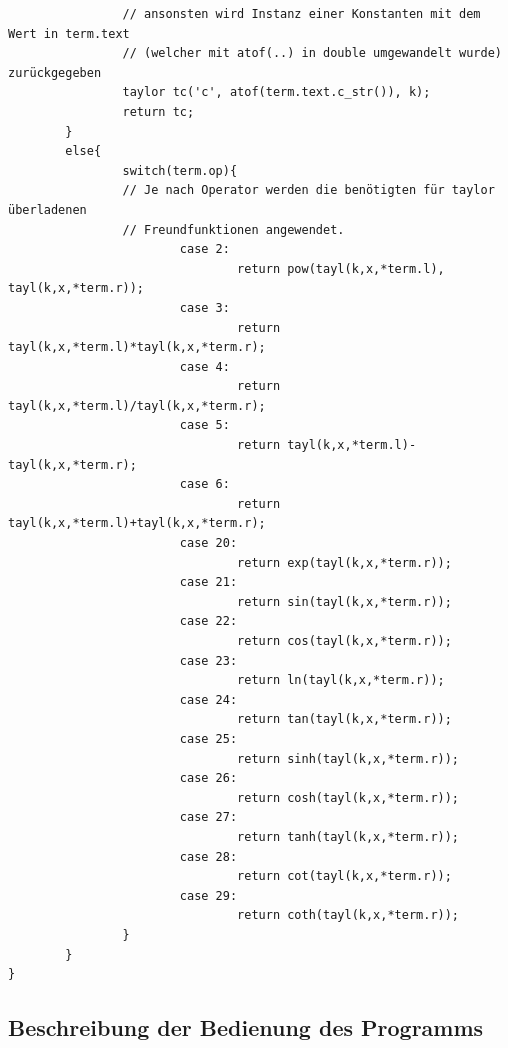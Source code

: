 \documentclass{scrartcl}
\begin{document}
\begin{verbatim}
                // ansonsten wird Instanz einer Konstanten mit dem Wert in term.text
                // (welcher mit atof(..) in double umgewandelt wurde) zurückgegeben
                taylor tc('c', atof(term.text.c_str()), k);
                return tc;		
        }
        else{
                switch(term.op){
                // Je nach Operator werden die benötigten für taylor überladenen
                // Freundfunktionen angewendet.
                        case 2:
                                return pow(tayl(k,x,*term.l), tayl(k,x,*term.r));
                        case 3:				
                                return tayl(k,x,*term.l)*tayl(k,x,*term.r);
                        case 4:				
                                return tayl(k,x,*term.l)/tayl(k,x,*term.r);
                        case 5:				
                                return tayl(k,x,*term.l)-tayl(k,x,*term.r);
                        case 6:		
                                return tayl(k,x,*term.l)+tayl(k,x,*term.r);
                        case 20:						
                                return exp(tayl(k,x,*term.r));
                        case 21:						
                                return sin(tayl(k,x,*term.r));
                        case 22:						
                                return cos(tayl(k,x,*term.r));
                        case 23:						
                                return ln(tayl(k,x,*term.r));
                        case 24:						
                                return tan(tayl(k,x,*term.r));
                        case 25:						
                                return sinh(tayl(k,x,*term.r));
                        case 26:						
                                return cosh(tayl(k,x,*term.r));
                        case 27:						
                                return tanh(tayl(k,x,*term.r));
                        case 28:						
                                return cot(tayl(k,x,*term.r));
                        case 29:						
                                return coth(tayl(k,x,*term.r));
                }		
        }
}
\end{verbatim}

\subsection{Beschreibung der Bedienung des Programms}
		
\end{document}
